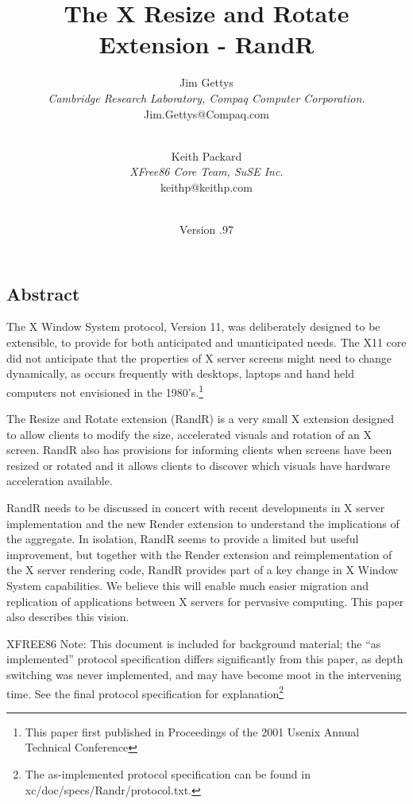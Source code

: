 \documentclass[twocolumn]{article}
\begin{document}
\date{}

\title{The X Resize and Rotate Extension - RandR}
\author{Jim Gettys\\
{\em Cambridge Research Laboratory, Compaq Computer Corporation.}\\
Jim.Gettys@Compaq.com \and\\
Keith Packard\\
{\em XFree86 Core Team, SuSE Inc.}\\
keithp@keithp.com\and\\
Version .97}
\maketitle
\thispagestyle{empty}

\subsection*{Abstract}
The X Window System protocol, Version 11, was deliberately
designed to be extensible, to provide for both anticipated and
unanticipated needs.  The X11 core did not anticipate that the
properties of X server screens might need to change dynamically, as
occurs frequently with desktops, laptops and hand held computers not
envisioned in the 1980's.\footnote{This paper first published in Proceedings of
the 2001 Usenix Annual Technical Conference}

The Resize and Rotate extension (RandR) is a very small X 
extension designed to allow clients to modify the size, accelerated
visuals and rotation of an X screen.  RandR also has provisions for informing
clients when screens have been resized or rotated and it allows clients to
discover which visuals have hardware acceleration available.

RandR needs to be discussed in concert with recent developments in X server
implementation and the new Render extension to understand the implications
of the aggregate. In isolation, RandR seems to provide a limited but useful
improvement, but together with the Render extension and reimplementation of
the X server rendering code, RandR provides part of a key change in X Window
System capabilities.  We believe this will enable much easier migration and
replication of applications between X servers for pervasive computing.  This
paper also describes this vision.

XFREE86 Note: This document is included for background material; the
``as implemented'' protocol specification differs significantly from
this paper, as depth switching was never implemented, and may have
become moot in the intervening time.  See the final protocol
specification for explanation\footnote{The as-implemented protocol
specification can be found in xc/doc/specs/Randr/protocol.txt.}
\end{document}
